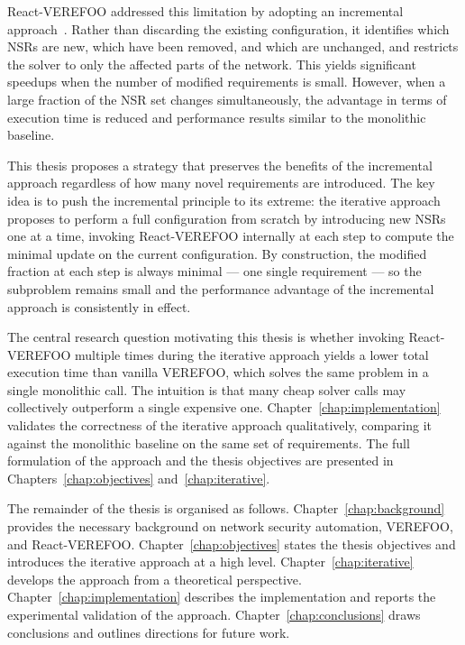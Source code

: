 React-VEREFOO addressed this limitation by adopting an incremental approach~\cite{reactverefoo}. Rather than discarding the existing configuration, it identifies which NSRs are new, which have been removed, and which are unchanged, and restricts the solver to only the affected parts of the network. This yields significant speedups when the number of modified requirements is small. However, when a large fraction of the NSR set changes simultaneously, the advantage in terms of execution time is reduced and performance results similar to the monolithic baseline.

This thesis proposes a strategy that preserves the benefits of the incremental approach regardless of how many novel requirements are introduced. The key idea is to push the incremental principle to its extreme: the iterative approach proposes to perform a full configuration from scratch by introducing new NSRs one at a time, invoking React-VEREFOO internally at each step to compute the minimal update on the current configuration. By construction, the modified fraction at each step is always minimal — one single requirement — so the subproblem remains small and the performance advantage of the incremental approach is consistently in effect.

The central research question motivating this thesis is whether invoking React-VEREFOO multiple times during the iterative approach yields a lower total execution time than vanilla VEREFOO, which solves the same problem in a single monolithic call. The intuition is that many cheap solver calls may collectively outperform a single expensive one. Chapter~\ref{chap:implementation} validates the correctness of the iterative approach qualitatively, comparing it against the monolithic baseline on the same set of requirements. The full formulation of the approach and the thesis objectives are presented in Chapters~\ref{chap:objectives} and~\ref{chap:iterative}.

The remainder of the thesis is organised as follows. Chapter~\ref{chap:background} provides the necessary background on network security automation, VEREFOO, and React-VEREFOO. Chapter~\ref{chap:objectives} states the thesis objectives and introduces the iterative approach at a high level. Chapter~\ref{chap:iterative} develops the approach from a theoretical perspective. Chapter~\ref{chap:implementation} describes the implementation and reports the experimental validation of the approach. Chapter~\ref{chap:conclusions} draws conclusions and outlines directions for future work.
